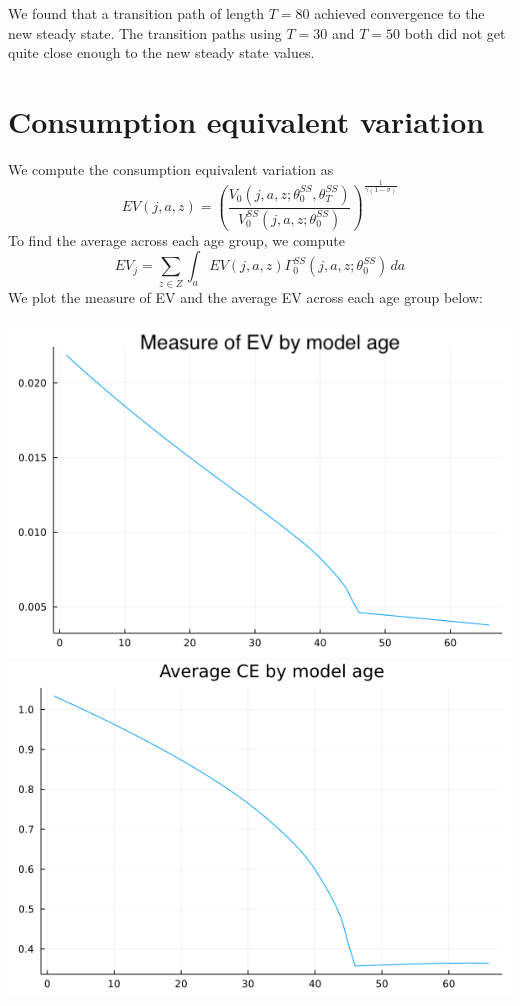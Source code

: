 \documentclass[12pt]{article}
\begin{document}
We found that a transition path of length $T = 80$ achieved convergence to the new steady state. The transition paths using $T = 30$ and $T = 50$ both did not get quite close enough to the new steady state values.

\section{Consumption equivalent variation}
We compute the consumption equivalent variation as
\[EV(j, a, z) = \left( \frac{V_0(j, a, z; \theta_0^{SS}, \theta_T^{SS})}{V_0^{SS}(j, a, z; \theta_0^{SS})}\right)^{\frac{1}{\gamma(1-\sigma)}} \]
To find the average across each age group, we compute
\[EV_j = \sum_{z \in Z} \int_{a} EV(j, a, z) \Gamma_0^{SS}(j, a, z; \theta_0^{SS})\, da\]
We plot the measure of EV and the average EV across each age group below:
\begin{center}
    \includegraphics[scale=0.4]{ce_meas.png}\\
    \includegraphics[scale=0.4]{avg_ce.png}
\end{center}
\end{document}
